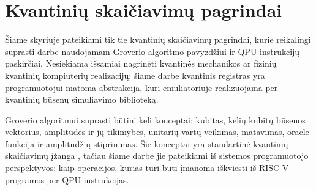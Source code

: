 \section{Kvantinių skaičiavimų pagrindai}
\label{chap:kvantiniu-skaiciavimu-pagrindai}

Šiame skyriuje pateikiami tik tie kvantinių skaičiavimų pagrindai, kurie reikalingi suprasti darbe naudojamam Groverio algoritmo pavyzdžiui ir QPU instrukcijų paskirčiai. Nesiekiama išsamiai nagrinėti kvantinės mechanikos ar fizinių kvantinių kompiuterių realizacijų; šiame darbe kvantinis registras yra programuotojui matoma abstrakcija, kuri emuliatoriuje realizuojama per kvantinių būsenų simuliavimo biblioteką.

Groverio algoritmui suprasti būtini keli konceptai: kubitas, kelių kubitų būsenos vektorius, amplitudės ir jų tikimybės, unitarių vartų veikimas, matavimas, oracle funkcija ir amplitudžių stiprinimas. Šie konceptai yra standartinė kvantinių skaičiavimų įžanga \cite{nielsen-chuang-2010,mermin-2007}, tačiau šiame darbe jie pateikiami iš sistemos programuotojo perspektyvos: kaip operacijos, kurias turi būti įmanoma iškviesti iš RISC-V programos per QPU instrukcijas.





